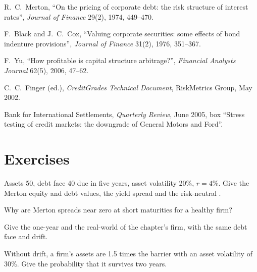 \begin{omsources}
\item R.\ C.\ Merton, ``On the pricing of corporate debt: the risk structure of interest
rates'', \emph{Journal of Finance} 29(2), 1974, 449--470.
\item F.\ Black and J.\ C.\ Cox, ``Valuing corporate securities: some effects of bond
indenture provisions'', \emph{Journal of Finance} 31(2), 1976, 351--367.
\item F.\ Yu, ``How profitable is capital structure arbitrage?'', \emph{Financial Analysts
Journal} 62(5), 2006, 47--62.
\item C.\ C.\ Finger (ed.), \emph{CreditGrades Technical Document}, RiskMetrics Group, May 2002.
\item Bank for International Settlements, \emph{Quarterly Review}, June 2005, box ``Stress
testing of credit markets: the downgrade of General Motors and Ford''.
\end{omsources}

\section{Exercises}

\begin{exercise}[$\star$]\label{exo:rc:structural-credit-models:1}
Assets 50, debt face 40 due in five years, asset volatility 20\%, $r = 4\%$. Give the
Merton equity and debt values, the yield spread and the risk-neutral .
\end{exercise}

\begin{exercise}[$\star$]\label{exo:rc:structural-credit-models:2}
Why are Merton spreads near zero at short maturities for a healthy firm?
\end{exercise}

\begin{exercise}[$\star$]\label{exo:rc:structural-credit-models:3}
Give the one-year  and the real-world  of the
chapter's firm, with the same debt face and drift.
\end{exercise}

\begin{exercise}[$\star\star$]\label{exo:rc:structural-credit-models:4}
Without drift, a firm's assets are 1.5 times the barrier with an asset volatility of 30\%.
Give the probability that it survives two years.
\end{exercise}

